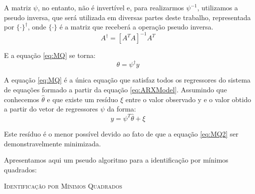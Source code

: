 A matriz $\psi$, no entanto, não é invertível e, para realizarmos $\psi^{-1}$, utilizamos a pseudo inversa, que será utilizada em diversas partes deste trabalho, representada por $\{ \cdot\}^\dagger$, onde $\{\cdot\}$ é a matriz que receberá a operação pseudo inversa.
\begin{equation}
A^\dagger=[A^TA]^{-1}A^T
\end{equation}

E a equação \eqref{eq:MQ} se torna:
\begin{equation}\label{eq:MQ2}
\theta=\psi^\dagger y
\end{equation}


A equação \eqref{eq:MQ} é a única equação que satisfaz todos os regressores do sistema de equações formado a partir da equação \eqref{eq:ARXModel}. Assumindo que conhecemos $\hat{\theta}$ e que existe um resíduo $\xi$ entre o valor observado y e o valor obtido a partir do vetor de regressores $\psi$ da forma:
\begin{equation}\label{eq:eMQxi}
y=\psi^T\hat{\theta}+\xi
\end{equation} 

Este resíduo é o menor possível devido ao fato de que a equação \eqref{eq:MQ2} ser demonstravelmente minimizada.


Apresentamos aqui um pseudo algoritmo para a identificação por mínimos quadrados:

\IncMargin{1em}
\begin{algorithm}[H]

	\Retorna{$\theta$}
	\label{alg:mq}
	\caption{\textsc{Identificação por Mínimos Quadrados}}
\end{algorithm}
\DecMargin{1em}



